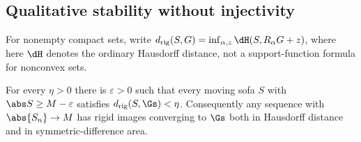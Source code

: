 \subsection{Qualitative stability without injectivity}

For nonempty compact sets, write
$d_{\rm rig}(S,G)=\inf_{\alpha,z}\dH(S,R_\alpha G+z)$, where here $\dH$
denotes the ordinary Hausdorff distance, not a support-function formula for
nonconvex sets.

\begin{theorem}\label{thm:stability-global}
For every $\eta>0$ there is $\varepsilon>0$ such that every moving sofa $S$
with $\abs S\ge M-\varepsilon$ satisfies $d_{\rm rig}(S,\Gs)<\eta$.
Consequently any sequence with $\abs{S_n}\to M$ has rigid images converging
to $\Gs$ both in Hausdorff distance and in symmetric-difference area.
\end{theorem}


